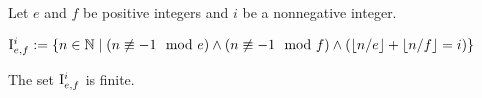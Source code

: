 %



\chapter{}

\section{}

Let $e$ and $f$ be positive integers
and $i$ be a nonnegative integer.

\begin{definition}
\label{def:setI}
\leanok
$
\mathrm{I}_{e,f}^i
:=
\{
n \in \mathbb{N}
\mid
(n \not \equiv - 1 \mod e)
\wedge
(n \not \equiv - 1 \mod f)
\wedge
(\lfloor n / e \rfloor + \lfloor n / f \rfloor = i)
\}
$
\end{definition}


\begin{lemma}
\label{lem:setI_finite}
The set $\mathrm{I}_{e,f}^i$ is finite.
\end{lemma}

